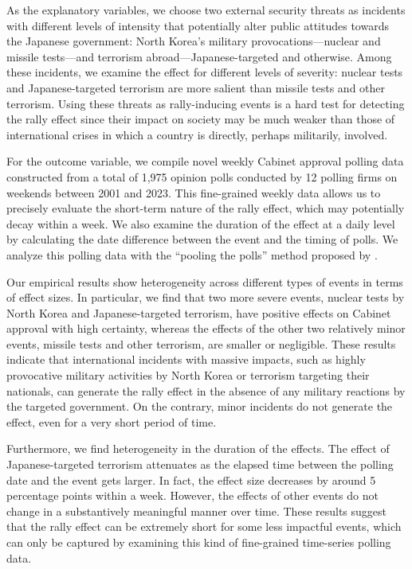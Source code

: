 \documentclass[letterpaper,12pt]{scrartcl}
\begin{document}
As the explanatory variables, we choose two external security threats as incidents with different levels of intensity that potentially alter public attitudes towards the Japanese government: North Korea's military provocations---nuclear and missile tests---and terrorism abroad---Japanese-targeted and otherwise. Among these incidents, we examine the effect for different levels of severity: nuclear tests and Japanese-targeted terrorism are more salient than missile tests and other terrorism. Using these threats as rally-inducing events is a hard test for detecting the rally effect since their impact on society may be much weaker than those of international crises in which a country is directly, perhaps militarily, involved.

For the outcome variable, we compile novel weekly Cabinet approval polling data constructed from a total of 1,975 opinion polls conducted by 12 polling firms on weekends between 2001 and 2023. This fine-grained weekly data allows us to precisely evaluate the short-term nature of the rally effect, which may potentially decay within a week. We also examine the duration of the effect at a daily level by calculating the date difference between the event and the timing of polls. We analyze this polling data with the ``pooling the polls'' method proposed by \citet{Jackman2005AustJPolitSci}.

Our empirical results show heterogeneity across different types of events in terms of effect sizes. In particular, we find that two more severe events, nuclear tests by North Korea and Japanese-targeted terrorism, have positive effects on Cabinet approval with high certainty, whereas the effects of the other two relatively minor events, missile tests and other terrorism, are smaller or negligible. These results indicate that international incidents with massive impacts, such as highly provocative military activities by North Korea or terrorism targeting their nationals, can generate the rally effect in the absence of any military reactions by the targeted government. On the contrary, minor incidents do not generate the effect, even for a very short period of time.

Furthermore, we find heterogeneity in the duration of the effects. The effect of Japanese-targeted terrorism attenuates as the elapsed time between the polling date and the event gets larger. In fact, the effect size decreases by around 5 percentage points within a week. However, the effects of other events do not change in a substantively meaningful manner over time. These results suggest that the rally effect can be extremely short for some less impactful events, which can only be captured by examining this kind of fine-grained time-series polling data.
\end{document}
